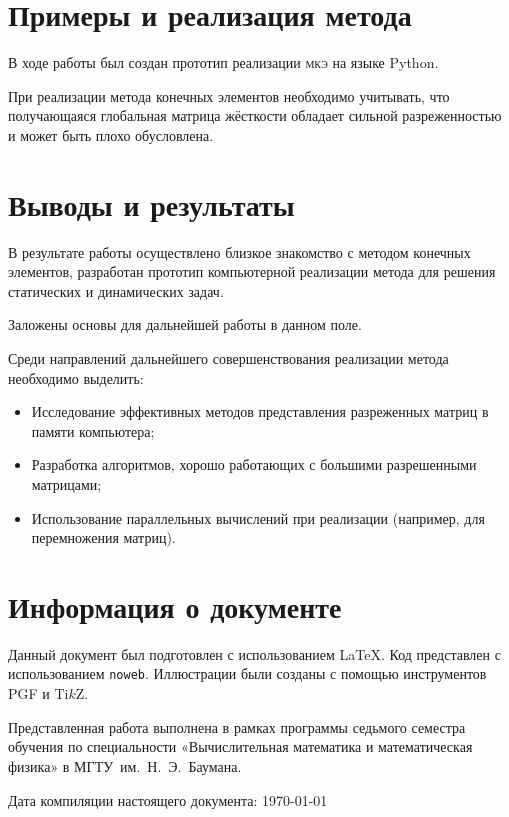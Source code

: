 \documentclass[10pt]{article}
\numberwithin{equation}{section}
\newcommand{\program}[1]{{\tt #1}}
\newcommand{\fem}{\textsc{мкэ}}
\begin{document}
\section{Примеры и реализация метода}
\label{sec:python}

В ходе работы был создан прототип реализации \fem{} на языке Python.

При реализации метода конечных элементов необходимо учитывать, что
получающаяся глобальная матрица жёсткости обладает сильной
разреженностью и может быть плохо обусловлена.



\section{Выводы и результаты}

В результате работы осуществлено близкое знакомство с методом конечных
элементов, разработан прототип компьютерной реализации метода для
решения статических и динамических задач.

Заложены основы для дальнейшей работы в данном поле.

Среди направлений дальнейшего совершенствования реализации метода
необходимо выделить:
\begin{itemize}
\item Исследование эффективных методов представления разреженных
  матриц в памяти компьютера;

\item Разработка алгоритмов, хорошо работающих с большими разрешенными
  матрицами;

\item Использование параллельных вычислений при реализации (например,
  для перемножения матриц).
\end{itemize}

\clearpage
\appendix
\section{Информация о документе}

Данный документ был подготовлен с использованием \LaTeX{}. Код
представлен с использованием \program{noweb}. Иллюстрации были созданы
с помощью инструментов PGF и Ti$k$Z.

Представленная работа выполнена в рамках программы седьмого семестра
обучения по специальности «Вычислительная математика и математическая
физика» в МГТУ им. Н. Э. Баумана.

Дата компиляции настоящего документа: \today



\end{document}
